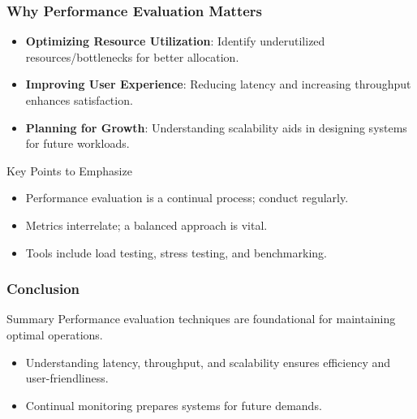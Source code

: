 \documentclass[aspectratio=169]{beamer}
\begin{document}
\begin{frame}[fragile]
    \frametitle{Why Performance Evaluation Matters}
    \begin{itemize}
        \item \textbf{Optimizing Resource Utilization}: Identify underutilized resources/bottlenecks for better allocation.
        \item \textbf{Improving User Experience}: Reducing latency and increasing throughput enhances satisfaction.
        \item \textbf{Planning for Growth}: Understanding scalability aids in designing systems for future workloads.
    \end{itemize}
    \begin{block}{Key Points to Emphasize}
        \begin{itemize}
            \item Performance evaluation is a continual process; conduct regularly.
            \item Metrics interrelate; a balanced approach is vital.
            \item Tools include load testing, stress testing, and benchmarking.
        \end{itemize}
    \end{block}
\end{frame}

\begin{frame}[fragile]
    \frametitle{Conclusion}
    \begin{block}{Summary}
        Performance evaluation techniques are foundational for maintaining optimal operations.
    \end{block}
    \begin{itemize}
        \item Understanding latency, throughput, and scalability ensures efficiency and user-friendliness.
        \item Continual monitoring prepares systems for future demands.
    \end{itemize}
\end{frame}
\end{document}
